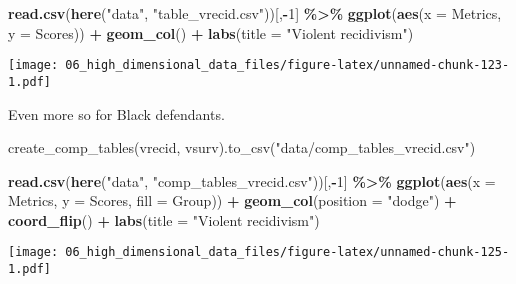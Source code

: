 \documentclass[
]{book}
\newenvironment{Shaded}{\begin{snugshade}}{\end{snugshade}}
\newcommand{\DataTypeTok}[1]{\textcolor[rgb]{0.13,0.29,0.53}{#1}}
\newcommand{\DecValTok}[1]{\textcolor[rgb]{0.00,0.00,0.81}{#1}}
\newcommand{\KeywordTok}[1]{\textcolor[rgb]{0.13,0.29,0.53}{\textbf{#1}}}
\newcommand{\NormalTok}[1]{#1}
\newcommand{\OperatorTok}[1]{\textcolor[rgb]{0.81,0.36,0.00}{\textbf{#1}}}
\newcommand{\StringTok}[1]{\textcolor[rgb]{0.31,0.60,0.02}{#1}}
\begin{document}
\begin{Shaded}
\begin{Highlighting}[]
\KeywordTok{read.csv}\NormalTok{(}\KeywordTok{here}\NormalTok{(}\StringTok{"data"}\NormalTok{, }\StringTok{"table\_vrecid.csv"}\NormalTok{))[,}\OperatorTok{{-}}\DecValTok{1}\NormalTok{] }\OperatorTok{\%\textgreater{}\%}
\StringTok{  }\KeywordTok{ggplot}\NormalTok{(}\KeywordTok{aes}\NormalTok{(}\DataTypeTok{x =}\NormalTok{ Metrics, }\DataTypeTok{y =}\NormalTok{ Scores)) }\OperatorTok{+}
\StringTok{  }\KeywordTok{geom\_col}\NormalTok{() }\OperatorTok{+}
\StringTok{  }\KeywordTok{labs}\NormalTok{(}\DataTypeTok{title =} \StringTok{"Violent recidivism"}\NormalTok{)}
\end{Highlighting}
\end{Shaded}

\texttt{[image: 06\_high\_dimensional\_data\_files/figure-latex/unnamed-chunk-123-1.pdf]}

Even more so for Black defendants.

\begin{Shaded}
\begin{Highlighting}[]

\NormalTok{create\_comp\_tables(vrecid, vsurv).to\_csv(}\StringTok{"data/comp\_tables\_vrecid.csv"}\NormalTok{)}
\end{Highlighting}
\end{Shaded}

\begin{Shaded}
\begin{Highlighting}[]
\KeywordTok{read.csv}\NormalTok{(}\KeywordTok{here}\NormalTok{(}\StringTok{"data"}\NormalTok{, }\StringTok{"comp\_tables\_vrecid.csv"}\NormalTok{))[,}\OperatorTok{{-}}\DecValTok{1}\NormalTok{] }\OperatorTok{\%\textgreater{}\%}
\StringTok{  }\KeywordTok{ggplot}\NormalTok{(}\KeywordTok{aes}\NormalTok{(}\DataTypeTok{x =}\NormalTok{ Metrics, }\DataTypeTok{y =}\NormalTok{ Scores, }\DataTypeTok{fill =}\NormalTok{ Group)) }\OperatorTok{+}
\StringTok{  }\KeywordTok{geom\_col}\NormalTok{(}\DataTypeTok{position =} \StringTok{"dodge"}\NormalTok{) }\OperatorTok{+}
\StringTok{  }\KeywordTok{coord\_flip}\NormalTok{() }\OperatorTok{+}
\StringTok{  }\KeywordTok{labs}\NormalTok{(}\DataTypeTok{title =} \StringTok{"Violent recidivism"}\NormalTok{)}
\end{Highlighting}
\end{Shaded}

\texttt{[image: 06\_high\_dimensional\_data\_files/figure-latex/unnamed-chunk-125-1.pdf]}
\end{document}
